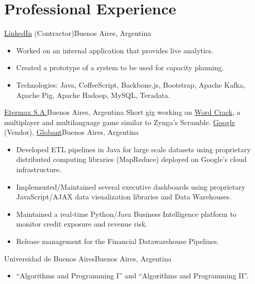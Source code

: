 \documentclass[11pt,a4paper,sans]{moderncv}
\newcommand\weblink[2] {{\color{href} \href{#1}{#2}}}
\begin{document}
\section{Professional Experience}
{\weblink{http://linkedin.com/}{LinkedIn} (Contractor)}{Buenos Aires, Argentina}{}{%
\begin{itemize}
  \item Worked on an internal application that provides live analytics.
  \item Created a prototype of a system to be used for capacity planning.
  \item Technologies: Java, CoffeeScript, Backbone.js, Bootstrap, Apache Kafka,
    Apache Pig, Apache Hadoop, MySQL, Teradata.
\end{itemize}
}
%
{\weblink{http://etermax.com/}{Etermax S.A.}}{Buenos Aires, Argentina}{}{%
Short gig working on
\weblink{https://play.google.com/store/apps/details?id=com.etermax.wordcrack.lite}{Word
Crack}, a multiplayer and multilanguage game similar to Zynga's Scramble.}
%
{\weblink{http://www.google.com}{Google} (Vendor),
\weblink{http://www.globant.com}{Globant}}{Buenos Aires, Argentina}{}{%
\begin{itemize}
  \item Developed ETL pipelines in Java for large scale datasets using
proprietary distributed computing libraries (MapReduce) deployed on Google's
cloud infrastructure.
  \item Implemented/Maintained several executive dashboards using proprietary
JavaScript/AJAX data visualization libraries and Data Warehouses.
  \item Maintained a real-time Python/Java Business Intelligence platform to
monitor credit exposure and revenue risk.
  \item Release management for the Financial Datawarehouse Pipelines.
\end{itemize}
}
%
{Universidad de Buenos Aires}{Buenos Aires, Argentina}{}{%
\begin{itemize}%
  \item ``Algorithms and Programming I'' and ``Algorithms and Programming II''.
\end{itemize}
}
\end{document}
